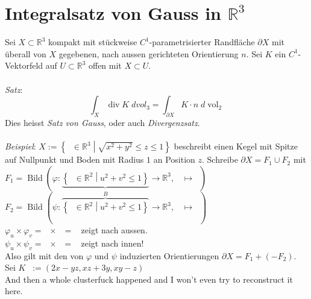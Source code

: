 \documentclass[12pt,a4paper,titlepage]{article}
\renewcommand{\d}{\partial}
\newcommand{\setR}{\mathbb{R}}
\newcommand{\vol}{\operatorname{vol}}
\newcommand{\divv}{\operatorname{div}}
\newcommand{\twovec}[2]{\mathop{\left(\substack{#1 \\ #2}\right)}}
\newcommand{\threevec}[3]{\mathop{\left(\substack{#1 \\ #2 \\ #3}\right)}}
\begin{document}
\section*{Integralsatz von Gauss in $\setR^3$}
Sei $X\subset\setR^3$ kompakt mit stückweise $C^1$-parametrisierter Randfläche $\d X$ mit überall von $X$ gegebenen, nach aussen gerichteten Orientierung $n$. Sei $K$ ein $C^1$-Vektorfeld auf $U\subset\setR^3$ offen mit $X\subset U$. \\
\\
\textit{Satz}: $$\int_X\divv K \;dvol_3=\int_{\d X}K\cdot n \;d\vol_2$$
Dies heisst \emph{Satz von Gauss}, oder auch \emph{Divergenzsatz}. \\
\\
\textit{Beispiel}: $X:=\left\{\threevec{x}{y}{z}\in\setR^3\middle|\sqrt{x^2+y^2}\leq z\leq 1\right\}$ beschreibt einen Kegel mit Spitze auf Nullpunkt und Boden mit Radius $1$ an Position $z$. Schreibe $\d X=F_1\cup F_2$ mit \\
$F_1=\operatorname{Bild}(\varphi:\underbrace{\left\{\twovec{u}{v}\in\setR^2\middle|u^2+v^2\leq 1\right\}}\to\setR^3,\;\twovec{u}{v}\mapsto\threevec{u}{v}{1})$ \\
$F_2=\operatorname{Bild}(\psi:\overbrace{\left\{\twovec{u}{v}\in\setR^2\middle|u^2+v^2\leq 1\right\}}^B\to\setR^3,\;\twovec{u}{v}\mapsto\threevec{u}{v}{\sqrt{u^2+v^2}})$ \\
$\varphi_u\times\varphi_v=\threevec{1}{0}{0}\times\threevec{0}{1}{0}=\threevec{0}{0}{1}$ zeigt nach aussen. \\
$\psi_u\times\psi_v=\threevec{1}{0}{\frac{u}{\sqrt{u^2+v^2}}}\times\threevec{0}{1}{\frac{v}{\sqrt{u^2+v^2}}}=\threevec{-u/\sqrt{u^2+v^2}}{-v/\sqrt{u^2+v^2}}{1}$ zeigt nach innen! \\
Also gilt mit den von $\varphi$ und $\psi$ induzierten Orientierungen $\d X=F_1+(-F_2)$. Sei $K\threevec{x}{y}{z}:=(2x-yz, xz+3y, xy-z)$ \\
And then a whole clusterfuck happened and I won't even try to reconstruct it here.
\end{document}
